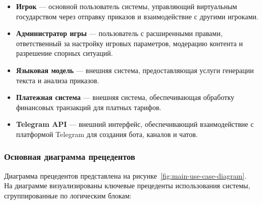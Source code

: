 \begin{itemize}
    \item \textbf{Игрок} — основной пользователь системы, управляющий виртуальным государством через отправку приказов и взаимодействие с другими игроками.

    \item \textbf{Администратор игры} — пользователь с расширенными правами, ответственный за настройку игровых параметров, модерацию контента и разрешение спорных ситуаций.

    \item \textbf{Языковая модель} — внешняя система, предоставляющая услуги генерации текста и анализа приказов.

    \item \textbf{Платежная система} — внешняя система, обеспечивающая обработку финансовых транзакций для платных тарифов.

    \item \textbf{Telegram API} — внешний интерфейс, обеспечивающий взаимодействие с платформой Telegram для создания бота, каналов и чатов.
\end{itemize}

\subsubsection{Основная диаграмма прецедентов}

Диаграмма прецедентов представлена на рисунке~\ref{fig:main-use-case-diagram}.\\
На диаграмме визуализированы ключевые прецеденты использования системы, сгруппированные по логическим блокам:

